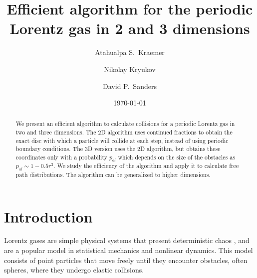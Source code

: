 \documentclass[pre,amsmath,amssymb, twocolumn, showpacs]{revtex4-1}
\newcommand{\pp}{p_{al}}
\begin{document}
\title{Efficient algorithm for the periodic Lorentz gas in 2 and 3 dimensions}
\author{Atahualpa S.~Kraemer}

\author{Nikolay Kryukov}

\author{David P.~Sanders}

\date{\today}
\begin{abstract}

We present an efficient algorithm to calculate collisions for a periodic Lorentz gas in two and three dimensions. The 2D algorithm uses continued fractions to obtain the exact disc with which a particle will collide at each step, instead of using periodic boundary conditions. The 3D version uses the 2D algorithm, but obtains these coordinates only with a probability $\pp$ which depends on the size of the obstacles as $\pp \sim 1-0.5 r^3$. We study the efficiency of the algorithm and apply it to calculate free path distributions. The algorithm can be generalized to higher dimensions. 
\end{abstract}

\maketitle

\section{Introduction}



Lorentz gases are simple physical systems that present deterministic chaos \cite{cvitanovic1992investigation}, and are a popular model in statistical mechanics and nonlinear dynamics. This model consists of point particles that move freely until they encounter obstacles, often spheres, where they undergo elastic collisions. 
\end{document}
